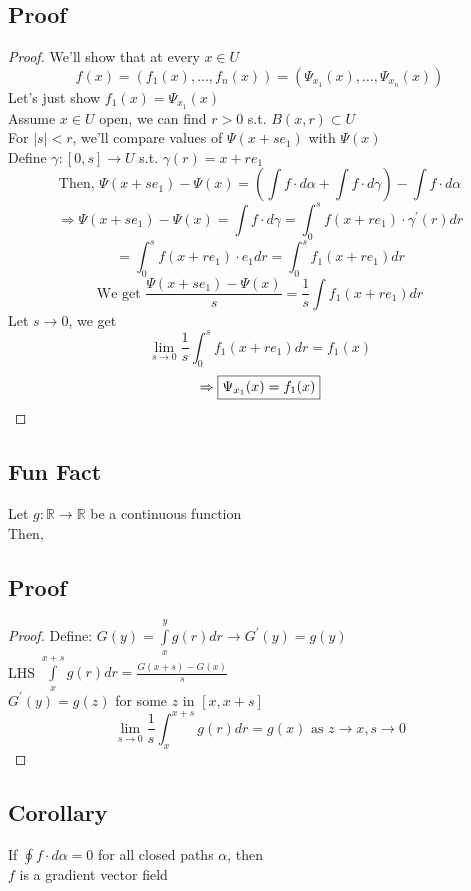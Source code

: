 \documentclass[12pt]{article}
\newcommand{\BR}{\mathbb R}
\newcommand{\prm}{^\prime}
\begin{document}
\subsection*{Proof}
  \begin{proof}
    We'll show that at every $x\in U$ \\
    \[ f(x)=(f_1(x),\dots,f_n(x))=(\Psi_{x_1}(x),\dots,\Psi_{x_n}(x)) \]
    Let's just show $f_1(x)=\Psi_{x_1}(x)$ \\
    Assume $x\in U$ open, we can find $r>0$ s.t. $B(x,r)\subset U$ \\
    For $|s|<r$, we'll compare values of $\Psi(x+se_1)$ with $\Psi(x)$ \\
    Define $\gamma:[0,s]\rightarrow U$ s.t. $\gamma(r) = x+re_1$ \\
    \[ \text{Then, }\Psi(x+se_1)-\Psi(x)=(\int f\cdot d\alpha+\int f\cdot d\gamma)-\int f\cdot d\alpha \]
    \[ \Rightarrow \Psi(x+se_1)-\Psi(x)=\int f\cdot d\gamma=\int_0^sf(x+re_1)\cdot\gamma\prm(r)dr \]
    \[ =\int_0^sf(x+re_1)\cdot e_1dr=\int_0^sf_1(x+re_1)dr \]
    \[ \text{We get }\frac{\Psi(x+se_1)-\Psi(x)}{s}=\frac{1}{s}\int f_1(x+re_1)dr \]
    Let $s\rightarrow 0$, we get \\
    \[ \lim_{s\rightarrow 0}\frac{1}{s}\int_0^sf_1(x+re_1)dr=f_1(x) \]
    \[ \Rightarrow\fbox{$\Psi_{x_1}(x)=f_1(x)$} \]
  \end{proof}
\subsection*{Fun Fact}
  Let $g:\BR\rightarrow\BR$ be a continuous function \\
  Then,  \\
\subsection*{Proof}
  \begin{proof}
    Define: $G(y)=\int\limits_x^yg(r)dr\rightarrow G\prm(y)=g(y)$ \\
    LHS $\int\limits_x^{x+s}g(r)dr=\frac{G(x+s)-G(x)}{s}$ \\
    $G\prm(y)=g(z)$ for some $z$ in $[x,x+s]$ \\
    \[ \lim_{s\rightarrow 0}\frac{1}{s}\int_x^{x+s}g(r)dr=g(x)\text{ as }z\rightarrow x, s\rightarrow 0 \]
  \end{proof}
\subsection*{Corollary}
  If $\oint f\cdot d\alpha=0$ for all closed paths $\alpha$, then \\
  $f$ is a gradient vector field
\end{document}
